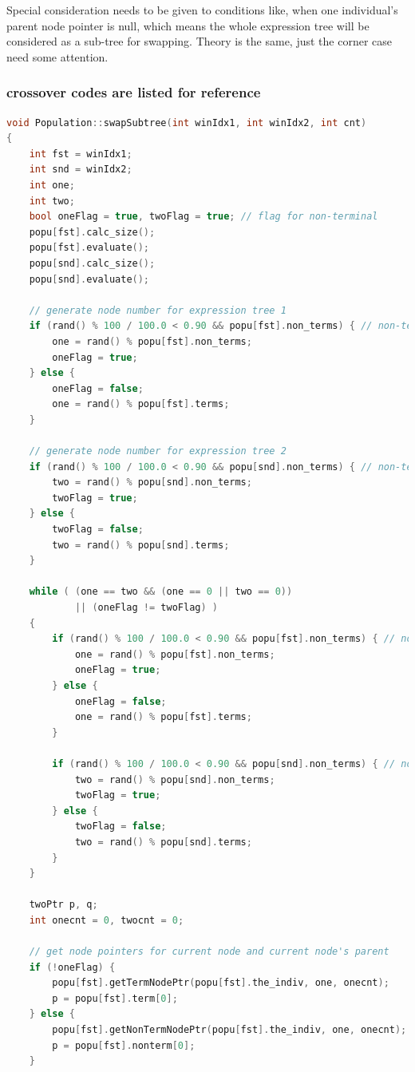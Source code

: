 \documentclass[10pt,b5paper]{article}
\begin{document}
Special consideration needs to be given to conditions like, when one individual's parent node pointer is null, which means the whole expression tree will be considered as a sub-tree for swapping. Theory is the same, just the corner case need some attention. 
\subsubsection{crossover codes are listed for reference}
\label{sec-1-2-2}
\begin{lstlisting}[language=c++]
void Population::swapSubtree(int winIdx1, int winIdx2, int cnt) 
{
    int fst = winIdx1;
    int snd = winIdx2;
    int one;
    int two;
    bool oneFlag = true, twoFlag = true; // flag for non-terminal
    popu[fst].calc_size();
    popu[fst].evaluate();
    popu[snd].calc_size();
    popu[snd].evaluate();

    // generate node number for expression tree 1
    if (rand() % 100 / 100.0 < 0.90 && popu[fst].non_terms) { // non-terminal swap
        one = rand() % popu[fst].non_terms;
        oneFlag = true;  
    } else {    
        oneFlag = false;
        one = rand() % popu[fst].terms;
    }

    // generate node number for expression tree 2
    if (rand() % 100 / 100.0 < 0.90 && popu[snd].non_terms) { // non-terminal swap
        two = rand() % popu[snd].non_terms;
        twoFlag = true;
    } else {    
        twoFlag = false;
        two = rand() % popu[snd].terms;
    }
    
    while ( (one == two && (one == 0 || two == 0))
            || (oneFlag != twoFlag) )
    {
        if (rand() % 100 / 100.0 < 0.90 && popu[fst].non_terms) { // non-terminal swap
            one = rand() % popu[fst].non_terms;
            oneFlag = true;
        } else {    
            oneFlag = false;
            one = rand() % popu[fst].terms;
        }
    
        if (rand() % 100 / 100.0 < 0.90 && popu[snd].non_terms) { // non-terminal swap
            two = rand() % popu[snd].non_terms;
            twoFlag = true;
        } else {    
            twoFlag = false;
            two = rand() % popu[snd].terms;
        }
    }

    twoPtr p, q;
    int onecnt = 0, twocnt = 0;

    // get node pointers for current node and current node's parent
    if (!oneFlag) {        
        popu[fst].getTermNodePtr(popu[fst].the_indiv, one, onecnt);
        p = popu[fst].term[0];
    } else {        
        popu[fst].getNonTermNodePtr(popu[fst].the_indiv, one, onecnt);
        p = popu[fst].nonterm[0];
    }


\end{lstlisting}
\end{document}
